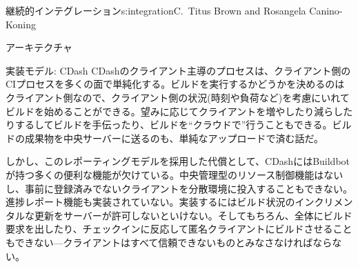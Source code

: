 \begin{aosachapter}{継続的インテグレーション}{s:integration}{C.\ Titus Brown and Rosangela Canino-Koning}
\begin{aosasect1}{アーキテクチャ}
\begin{aosasect2}{実装モデル: CDash}
CDashのクライアント主導のプロセスは、クライアント側のCIプロセスを多くの面で単純化する。ビルドを実行するかどうかを決めるのはクライアント側なので、クライアント側の状況(時刻や負荷など)を考慮にいれてビルドを始めることができる。望みに応じてクライアントを増やしたり減らしたりするしてビルドを手伝ったり、ビルドを``クラウドで''行うこともできる。ビルドの成果物を中央サーバーに送るのも、単純なアップロードで済む話だ。

しかし、このレポーティングモデルを採用した代償として、CDashにはBuildbotが持つ多くの便利な機能が欠けている。中央管理型のリソース制御機能はないし、事前に登録済みでないクライアントを分散環境に投入することもできない。進捗レポート機能も実装されていない。実装するにはビルド状況のインクリメンタルな更新をサーバーが許可しないといけない。そしてもちろん、全体にビルド要求を出したり、チェックインに反応して匿名クライアントにビルドさせることもできない---クライアントはすべて信頼できないものとみなさなければならない。


\end{aosasect2}
\end{aosasect1}
\end{aosachapter}
